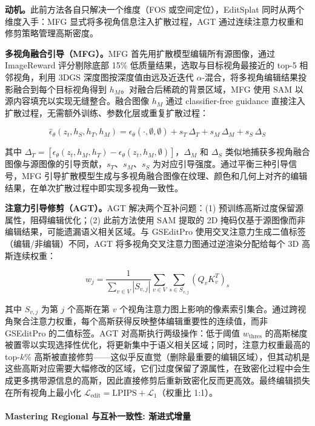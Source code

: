 \textbf{动机。}此前方法各自只解决一个维度（FOS 或空间定位），EditSplat 同时从两个维度入手：MFG 显式将多视角信息注入扩散过程，AGT 通过连续注意力权重和修剪策略管理高斯密度。

\textbf{多视角融合引导（MFG）。}MFG 首先用扩散模型编辑所有源图像，通过 ImageReward 评分剔除底部 15\% 低质量结果，选取与目标视角最接近的 top-5 相邻视角，利用 3DGS 深度图按深度值由远及近迭代 $\alpha$-混合，将多视角编辑结果投影融合到每个目标视角得到 $h_M$。对融合后稀疏的背景区域，MFG 使用 SAM 以源内容填充以实现无缝整合。融合图像 $h_M$ 通过 classifier-free guidance 直接注入扩散过程，无需额外训练、参数化层或重复扩散过程：

\begin{equation}
    \hat{\epsilon}_\theta(z_t, h_S, h_T, h_M) = \epsilon_\theta(\cdot,\emptyset,\emptyset) + s_T\,\Delta_T + s_M\,\Delta_M + s_S\,\Delta_S
\end{equation}

其中 $\Delta_T = [\epsilon_\theta(z_t, h_M, h_T) - \epsilon_\theta(z_t, h_M, \emptyset)]$，$\Delta_M$ 和 $\Delta_S$ 类似地捕获多视角融合图像与源图像的引导贡献，$s_T$、$s_M$、$s_S$ 为对应引导强度。通过平衡三种引导信号，MFG 引导扩散模型生成与多视角融合图像在纹理、颜色和几何上对齐的编辑结果，在单次扩散过程中即实现多视角一致性。

\textbf{注意力引导修剪（AGT）。}AGT 解决两个互补问题：(1) 预训练高斯过度保留源属性，阻碍编辑优化；(2) 此前方法使用 SAM 提取的 2D 掩码仅基于源图像而非编辑结果，可能遗漏语义相关区域。与 GSEditPro 使用交叉注意力生成二值标签（编辑/非编辑）不同，AGT 将多视角交叉注意力图通过逆渲染分配给每个 3D 高斯连续权重：

\begin{equation}
    w_j = \frac{1}{\sum_{v \in V}|S_{v,j}|} \sum_{v \in V} \sum_{s \in S_{v,j}} (Q_v K_v^T)_{s}
\end{equation}

其中 $S_{v,j}$ 为第 $j$ 个高斯在第 $v$ 个视角注意力图上影响的像素索引集合。通过跨视角聚合注意力权重，每个高斯获得反映整体编辑重要性的连续值，而非 GSEditPro 的二值标签。AGT 对高斯执行两级操作：低于阈值 $w_{\text{thres}}$ 的高斯梯度被置零以实现选择性优化，将更新集中于语义相关区域；同时，注意力权重最高的 top-$k\%$ 高斯被直接修剪——这似乎反直觉（删除最重要的编辑区域），但其动机是这些高斯对应需要大幅修改的区域，它们过度保留了源属性，在致密化过程中会生成更多携带源信息的高斯，因此直接修剪后重新致密化反而更高效。最终编辑损失在所有视角上最小化 $\mathcal{L}_{\text{edit}} = \text{LPIPS} + \mathcal{L}_1$（权重比 1:1）。

\paragraph{Mastering Regional 与互补一致性: 渐进式增量}

